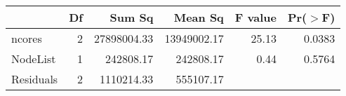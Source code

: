 \begin{table}[ht]
\centering
\begin{tabular}{lrrrrr}
  \hline
 & Df & Sum Sq & Mean Sq & F value & Pr($>$F) \\ 
  \hline
ncores & 2 & 27898004.33 & 13949002.17 & 25.13 & 0.0383 \\ 
  NodeList & 1 & 242808.17 & 242808.17 & 0.44 & 0.5764 \\ 
  Residuals & 2 & 1110214.33 & 555107.17 &  &  \\ 
   \hline
\end{tabular}
\end{table}
